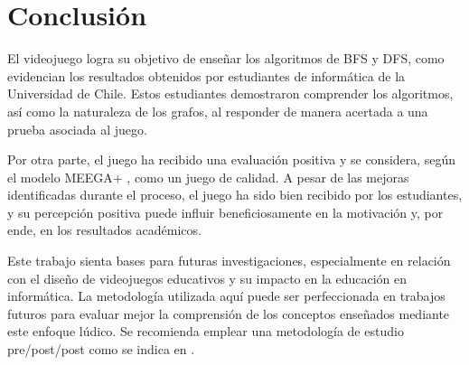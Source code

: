 \chapter{Conclusión}

El videojuego logra su objetivo de enseñar los algoritmos de BFS y DFS, como evidencian los resultados obtenidos por estudiantes de informática de la Universidad de Chile. Estos estudiantes demostraron comprender los algoritmos, así como la naturaleza de los grafos, al responder de manera acertada a una prueba asociada al juego.

Por otra parte, el juego ha recibido una evaluación positiva y se considera, según el modelo MEEGA+ \cite{meegaplus}, como un juego de calidad. A pesar de las mejoras identificadas durante el proceso, el juego ha sido bien recibido por los estudiantes, y su percepción positiva puede influir beneficiosamente en la motivación y, por ende, en los resultados académicos. 

Este trabajo sienta bases para futuras investigaciones, especialmente en relación con el diseño de videojuegos educativos y su impacto en la educación en informática. La metodología utilizada aquí puede ser perfeccionada en trabajos futuros para evaluar mejor la comprensión de los conceptos enseñados mediante este enfoque lúdico. Se recomienda emplear una metodología de estudio pre/post/post como se indica en \cite{HowGamesComputingEducationEvaluated}. 







